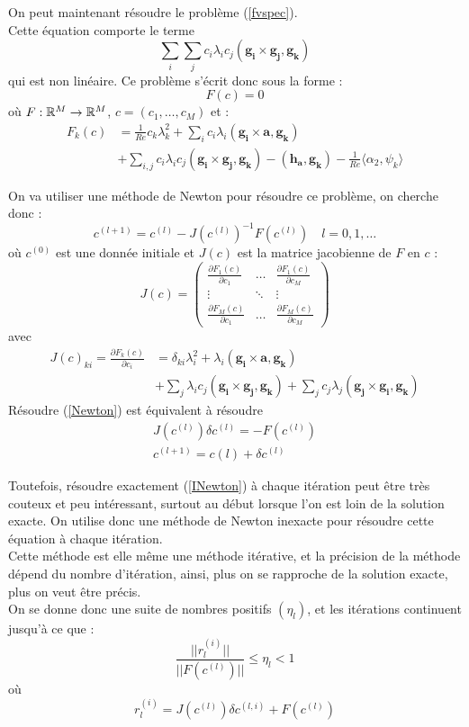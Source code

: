 On peut maintenant résoudre le problème (\ref{fvspec}).\\
Cette équation comporte le terme
\[
\sum_i\sum_j c_i\lambda_i c_j(\mathbf{g_i}\times \mathbf{g_j}, \mathbf{g_k})
\]
qui est non linéaire. Ce problème s'écrit donc sous la forme :
\[
F(c) = 0
\]
où $F:{\mathbb{R}}^M\rightarrow{\mathbb{R}}^M$, $c=(c_1,\ldots, c_M)$ et :
\begin{align*}
F_k(c) &= \frac{1}{Re} c_k\lambda_k^2 + \sum_i c_i\lambda_i(\mathbf{g_i}\times \mathbf{a}, \mathbf{g_k})\\
&+ \sum_{i,j} c_i\lambda_i c_j (\mathbf{g_i}\times \mathbf{g_j}, \mathbf{g_k}) - (\mathbf{h_a},\mathbf{g_k}) - \frac{1}{Re}\langle \alpha_2, \psi_k \rangle
\end{align*}

On va utiliser une méthode de Newton pour résoudre ce problème, on cherche donc :
\begin{equation}
\label{Newton}
c^{(l+1)} = c^{(l)} - J(c^{(l)})^{-1}F(c^{(l)})\quad l=0,1,\ldots
\end{equation}
où $c^{(0)}$ est une donnée initiale et $J(c)$ est la matrice jacobienne de $F$ en $c$ :
\[
J(c)=
\begin{pmatrix}
\frac{\partial F_1(c)}{\partial c_1} & \ldots & \frac{\partial F_1(c)}{\partial c_M}\\
\vdots & \ddots & \vdots\\
\frac{\partial F_M(c)}{\partial c_1} & \ldots & \frac{\partial F_M(c)}{\partial c_M}
\end{pmatrix}
\]
avec 
\begin{align*}
J(c)_{ki} = \frac{\partial F_k(c)}{\partial c_i} &= \delta_{ki}\lambda_i^2 + \lambda_i(\mathbf{g_i}\times \mathbf{a},\mathbf{g_k})\\
&+ \sum_j\lambda_i c_j (\mathbf{g_i}\times\mathbf{g_j},\mathbf{g_k}) + \sum_j c_j\lambda_j (\mathbf{g_j}\times\mathbf{g_i},\mathbf{g_k})
\end{align*}
Résoudre (\ref{Newton}) est équivalent à résoudre 
\begin{equation}
\label{INewton}
\begin{aligned}
J(c^{(l)})\delta c^{(l)} = -F(c^{(l)})\\
c^{(l+1)}=c{(l)}+\delta c^{(l)}
\end{aligned}
\end{equation}

Toutefois, résoudre exactement (\ref{INewton}) à chaque itération peut être très couteux et peu intéressant, surtout au début lorsque l'on est loin de la solution exacte. On utilise donc une méthode de Newton inexacte pour résoudre cette équation à chaque itération.\\
Cette méthode est elle même une méthode itérative, et la précision de la méthode dépend du nombre d'itération, ainsi, plus on se rapproche de la solution exacte, plus on veut être précis.
\\On se donne donc une suite de nombres positifs $(\eta_l)$, et les itérations continuent jusqu'à ce que :
\[
\frac{||r_l^{(i)}||}{||F(c^{(l)})||} \leq \eta_l<1
\]
où
\[
r_l^{(i)} = J(c^{(l)})\delta c^{(l,i)} + F(c^{(l)})
\]


